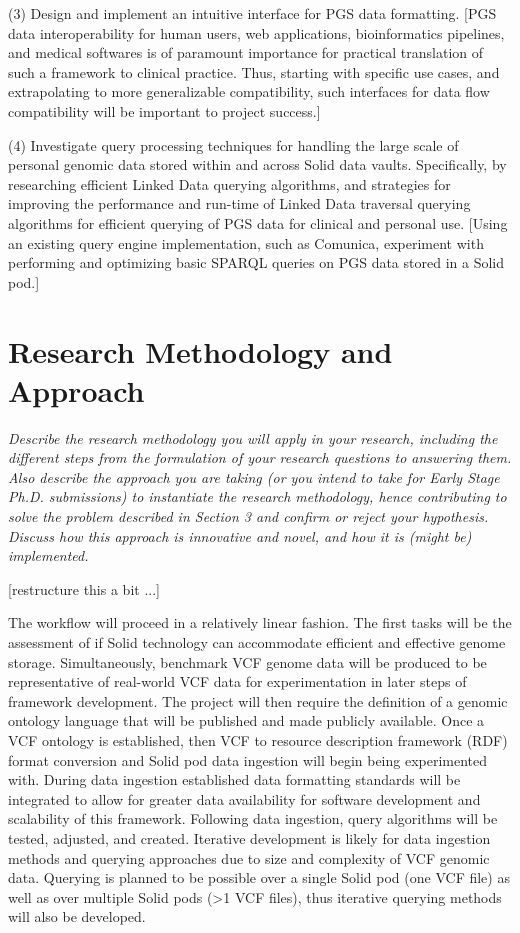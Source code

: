 \documentclass{article}
\begin{document}
(3) Design and implement an intuitive interface for PGS data formatting. [PGS data interoperability for human users, web applications, bioinformatics pipelines, and medical softwares is of paramount importance for practical translation of such a framework to clinical practice. Thus, starting with specific use cases, and extrapolating to more generalizable compatibility, such interfaces for data flow compatibility will be important to project success.]

(4) Investigate query processing techniques for handling the large scale of personal genomic data stored within and across Solid data vaults. Specifically, by researching efficient Linked Data querying algorithms, and strategies for improving the performance and run-time of Linked Data traversal querying algorithms for efficient querying of PGS data for clinical and personal use. [Using an existing query engine implementation, such as Comunica, experiment with performing and optimizing basic SPARQL queries on PGS data stored in a Solid pod.]



\section{Research Methodology and Approach}
\textit{Describe the research methodology you will apply in your research, including the different steps from the formulation of your research questions to answering them. Also describe the approach you are taking (or you intend to take for Early Stage Ph.D. submissions) to instantiate the research methodology, hence contributing to solve the problem described in Section 3 and confirm or reject your hypothesis. Discuss how this approach is innovative and novel, and how it is (might be) implemented.}

[restructure this a bit ...]

The workflow will proceed in a relatively linear fashion. The first tasks will be the assessment of if Solid technology can accommodate efficient and effective genome storage. Simultaneously, benchmark VCF genome data will be produced to be representative of real-world VCF data for experimentation in later steps of framework development. The project will then require the definition of a genomic ontology language that will be published and made publicly available. Once a VCF ontology is established, then VCF to resource description framework (RDF) format conversion and Solid pod data ingestion will begin being experimented with. During data ingestion established data formatting standards will be integrated to allow for greater data availability for software development and scalability of this framework. Following data ingestion, query algorithms will be tested, adjusted, and created. Iterative development is likely for data ingestion methods and querying approaches due to size and complexity of VCF genomic data. Querying is planned to be possible over a single Solid pod (one VCF file) as well as over multiple Solid pods (>1 VCF files), thus iterative querying methods will also be developed. 
\end{document}
